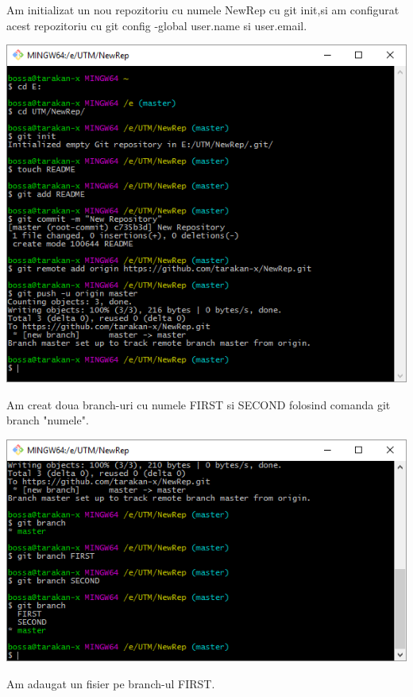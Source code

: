 Am initializat un nou repozitoriu cu numele NewRep cu git init,si am configurat acest repozitoriu cu git config \--global user.name si user.email.
\begin{center}
\includegraphics[scale=0.7]{images/newrep.png} 
\end{center}
Am creat doua branch-uri cu numele FIRST si SECOND folosind comanda git branch "numele".
\begin{center}
\includegraphics[scale=0.7]{images/branch.png} 
\end{center}
Am adaugat un fisier pe branch-ul FIRST.

